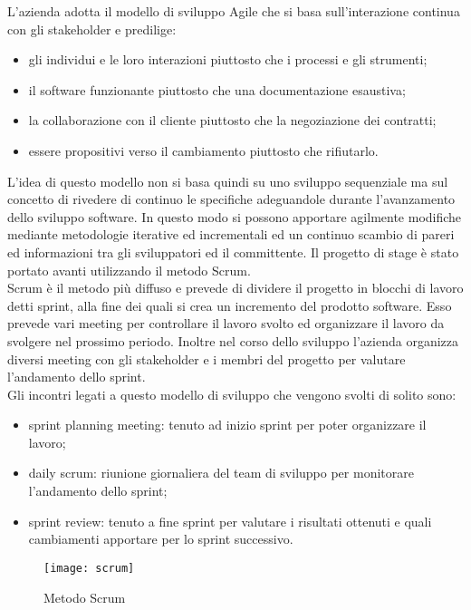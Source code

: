 L'azienda adotta il modello di sviluppo Agile che si basa sull'interazione continua con gli stakeholder e predilige:
\begin{itemize}
	\item gli individui e le loro interazioni piuttosto che i processi e gli strumenti;
	\item il software funzionante piuttosto che una documentazione esaustiva;
	\item la collaborazione con il cliente piuttosto che la negoziazione dei contratti;
	\item essere propositivi verso il cambiamento piuttosto che rifiutarlo.
\end{itemize}
L'idea di questo modello non si basa quindi su uno sviluppo sequenziale ma sul concetto di rivedere di continuo le specifiche adeguandole durante l'avanzamento dello sviluppo software. In questo modo si possono apportare agilmente modifiche mediante metodologie iterative ed incrementali ed un continuo scambio di pareri ed informazioni tra gli sviluppatori ed il committente. Il progetto di stage è stato portato avanti utilizzando il metodo Scrum.\\
Scrum è il metodo più diffuso e prevede di dividere il progetto in blocchi di lavoro detti sprint, alla fine dei quali si crea un incremento del prodotto software. Esso prevede vari meeting per controllare il lavoro svolto ed organizzare il lavoro da svolgere nel prossimo periodo. Inoltre nel corso dello sviluppo l'azienda organizza diversi meeting con gli stakeholder e i membri del progetto per valutare l'andamento dello sprint.\\
Gli incontri legati a questo modello di sviluppo che vengono svolti di solito sono:
\begin{itemize}
	\item sprint planning meeting: tenuto ad inizio sprint per poter organizzare il lavoro;
	\item daily scrum: riunione giornaliera del team di sviluppo per monitorare l'andamento dello sprint;
	\item sprint review: tenuto a fine sprint per valutare i risultati ottenuti e quali cambiamenti apportare per lo sprint successivo.
\end{itemize}
\begin{figure}[H]
	\begin{center}
		\texttt{[image: scrum]}
		\caption{Metodo Scrum}
	\end{center}
\end{figure}
